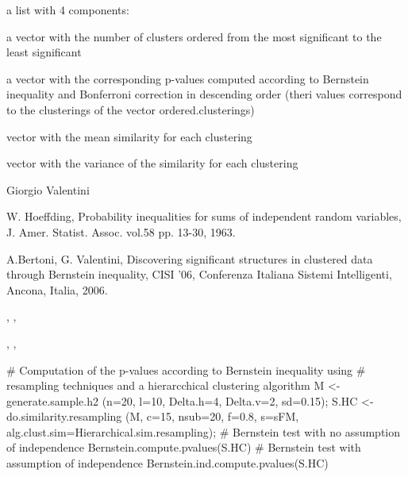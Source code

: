 \documentclass{article}
\begin{document}
\begin{Value}
a list with 4 components:
\begin{ldescription}
\item[\code{ordered.clusterings }] a vector with the number of clusters ordered from the most significant to the least significant
\item[\code{p.value }] a vector with the corresponding p-values computed according to Bernstein inequality and Bonferroni correction
in descending order (theri values correspond to the clusterings of the vector ordered.clusterings)
\item[\code{means }] vector with the mean similarity for each clustering
\item[\code{variance }] vector with the variance of the similarity for each clustering
\end{ldescription}
\end{Value}
\begin{Author}\relax
Giorgio Valentini 
\end{Author}
\begin{References}\relax
W. Hoeffding, Probability inequalities for sums of independent random variables, J. Amer. Statist. Assoc. vol.58 pp. 13-30, 1963.

A.Bertoni, G. Valentini, Discovering significant structures in clustered data through Bernstein inequality, 
CISI '06, Conferenza Italiana Sistemi Intelligenti, Ancona, Italia, 2006.
\end{References}
\begin{SeeAlso}\relax
{}, ,

, , 
\end{SeeAlso}
\begin{Examples}
\begin{ExampleCode}
# Computation of the p-values according to Bernstein inequality using 
# resampling techniques and a hierarcchical clustering algorithm
M <- generate.sample.h2 (n=20, l=10, Delta.h=4, Delta.v=2, sd=0.15);
S.HC <- do.similarity.resampling (M, c=15, nsub=20, f=0.8, s=sFM, 
                           alg.clust.sim=Hierarchical.sim.resampling);
# Bernstein test with no assumption of independence
Bernstein.compute.pvalues(S.HC)
# Bernstein test with  assumption of independence
Bernstein.ind.compute.pvalues(S.HC)
\end{ExampleCode}
\end{Examples}
\end{document}
